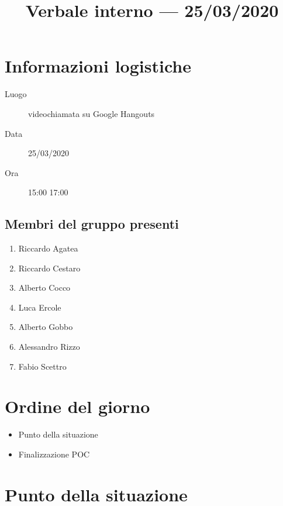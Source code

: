 \documentclass{article}
\title{Verbale interno --- 25/03/2020}
\begin{document}


\section{Informazioni logistiche}%
\label{sec:informazioni_logistiche}

\begin{description}
  \item [Luogo] videochiamata su Google Hangouts
  \item [Data] 25/03/2020
  \item [Ora] 15:00  17:00
\end{description}

\subsection{Membri del gruppo presenti}%
\label{sub:membri_del_gruppo_presenti}

\begin{enumerate}
  \item Riccardo Agatea
  \item Riccardo Cestaro
  \item Alberto Cocco
  \item Luca Ercole
  \item Alberto Gobbo
  \item Alessandro Rizzo
  \item Fabio Scettro
\end{enumerate}

\section{Ordine del giorno}%
\label{sec:ordine_del_giorno}

\begin{itemize}
  \item Punto della situazione
  \item Finalizzazione POC
\end{itemize}

\section{Punto della situazione}%
\label{sec:punto_della_situazione}
\end{document}

